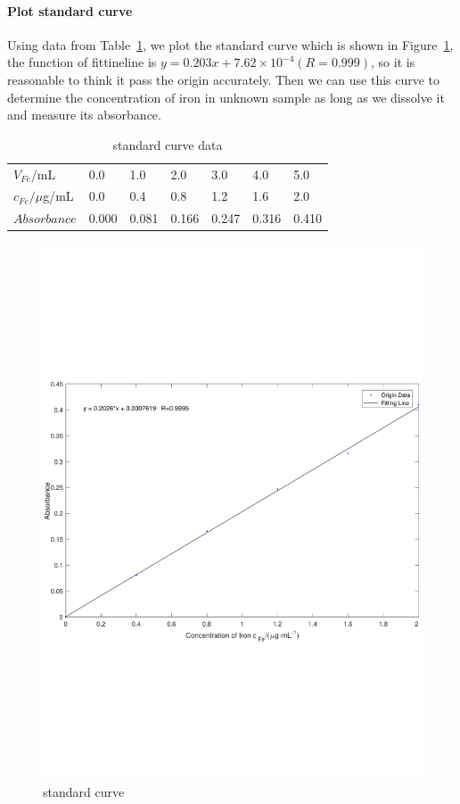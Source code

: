 \paragraph{Plot standard curve}
Using data from Table~\ref{tab.Cal}, we plot the standard curve which is shown in Figure~\ref{fig1}, the function of fittineline is $y=0.203x+7.62\times 10^{-4}(R=0.999)$, so it is reasonable to think it pass the origin accurately. Then we can use this curve to determine the concentration of iron in unknown sample as long as we dissolve it and measure its absorbance.
\begin{table}[H]
	\caption{standard curve data}
	\label{tab.Cal}
	\begin{tabular}{lllllll}
	\toprule
	$V_{Fe}$/mL    & 0.0 & 1.0 & 2.0 & 3.0 & 4.0 & 5.0 \\
	$c_{Fe}/\mu$g/mL
				   & 0.0 & 0.4 & 0.8 & 1.2 & 1.6 & 2.0 \\
	\midrule
	$Absorbance$     &0.000&0.081&0.166&0.247&0.316&0.410\\
	\bottomrule
	\end{tabular}
\end{table}

\begin{figure}[H]
	\includegraphics[width=\linewidth]{Fig1.pdf}
	\caption{standard curve}
	\label{fig1}
\end{figure}

